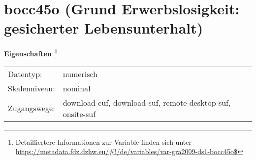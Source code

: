 
    \setcounter{footnote}{0}

    \vspace*{-1.8cm}
	\section{bocc45o (Grund Erwerbslosigkeit: gesicherter Lebensunterhalt)}
	\label{section:bocc45o}



    \vspace*{0.5cm}
    \noindent\textbf{Eigenschaften
	\footnote{Detailliertere Informationen zur Variable finden sich unter
		\url{https://metadata.fdz.dzhw.eu/\#!/de/variables/var-gra2009-ds1-bocc45o$}}}\\
	\begin{tabularx}{\hsize}{@{}lX}
	Datentyp: & numerisch \\
	Skalenniveau: & nominal \\
	Zugangswege: &
	  download-cuf, 
	  download-suf, 
	  remote-desktop-suf, 
	  onsite-suf
 \\
    \end{tabularx}




